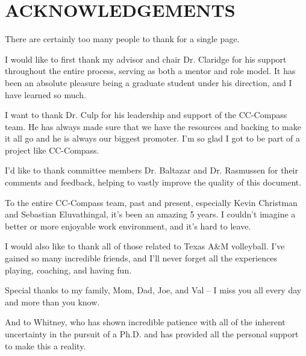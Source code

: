 %
%
%


\chapter*{\texorpdfstring{\MakeUppercase{ACKNOWLEDGEMENTS}}{ACKNOWLEDGEMENTS}}


There are certainly too many people to thank for a single page.

I would like to first thank my advisor and chair Dr. Claridge for his
support throughout the entire process, serving as both a mentor and role
model. It has been an absolute pleasure being a graduate student under
his direction, and I have learned so much. 

I want to thank Dr. Culp for his leadership and support of the CC-Compass team.
He has always made sure that we have the resources and backing to make
it all go and he is always our biggest promoter. I'm so glad I got to be part
of a project like CC-Compass.

I'd like to thank committee members Dr. Baltazar and Dr. Rasmussen for
their comments and feedback, helping to vastly improve the quality of
this document.

To the entire CC-Compass team, past and present, especially Kevin
Christman and Sebastian Eluvathingal, it's been an amazing 5 years. I
couldn't imagine a better or more enjoyable work environment, and it's
hard to leave. 

I would also like to thank all of those related to Texas A\&M
volleyball. I've gained so many incredible friends, and I'll never forget
all the experiences playing, coaching, and having fun. 

Special thanks to my family, Mom, Dad, Joe, and Val -- I miss you all
every day and more than you know.

And to Whitney, who has shown incredible patience with all of the
inherent uncertainty in the pursuit of a Ph.D. and has provided all the
personal support to make this a reality.

\pagebreak{}
